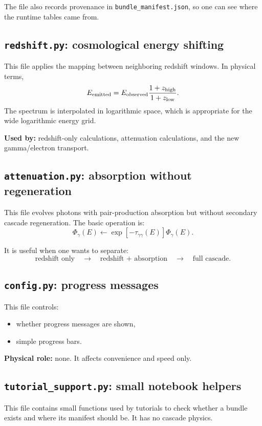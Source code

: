 \documentclass[11pt]{article}
\newcommand{\code}[1]{\texttt{#1}}
\begin{document}
The file also records provenance in \code{bundle\_manifest.json}, so one can
see where the runtime tables came from.

\subsection{\code{redshift.py}: cosmological energy shifting}

This file applies the mapping between neighboring redshift windows. In physical
terms,
\[
  E_{\rm emitted}=E_{\rm observed}\frac{1+z_{\rm high}}{1+z_{\rm low}} .
\]
The spectrum is interpolated in logarithmic space, which is appropriate for the
wide logarithmic energy grid.

\textbf{Used by:} redshift-only calculations, attenuation calculations, and the
new gamma/electron transport.

\subsection{\code{attenuation.py}: absorption without regeneration}

This file evolves photons with pair-production absorption but without secondary
cascade regeneration. The basic operation is:
\[
  \Phi_\gamma(E) \leftarrow
  \exp[-\tau_{\gamma\gamma}(E)]\Phi_\gamma(E).
\]

It is useful when one wants to separate:
\[
  \text{redshift only}
  \quad \rightarrow \quad
  \text{redshift + absorption}
  \quad \rightarrow \quad
  \text{full cascade}.
\]

\subsection{\code{config.py}: progress messages}

This file controls:
\begin{itemize}
  \item whether progress messages are shown,
  \item simple progress bars.
\end{itemize}

\textbf{Physical role:} none. It affects convenience and speed only.

\subsection{\code{tutorial\_support.py}: small notebook helpers}

This file contains small functions used by tutorials to check whether a bundle
exists and where its manifest should be. It has no cascade physics.
\end{document}
